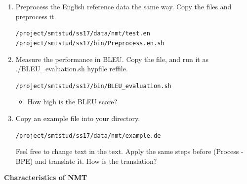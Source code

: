\documentclass[12pt,fleqn]{article}
\begin{document}
\begin{enumerate}
\item Preprocess the English reference data the same way. Copy the files and preprocess it. 

\texttt{/project/smtstud/ss17/data/nmt/test.en}  \\ 
\texttt{/project/smtstud/ss17/bin/Preprocess.en.sh} \\ 

\item Measure the performance in BLEU. Copy the file, and run it as ./BLEU\_evaluation.sh hypfile reffile. 

\texttt{/project/smtstud/ss17/bin/BLEU\_evaluation.sh} \\ 

\begin{itemize} 
 \item How high is the BLEU score? 
\end{itemize}

\item Copy an example file into your directory. 

\texttt{/project/smtstud/ss17/data/nmt/example.de} 

Feel free to change text in the text. Apply the same steps before (Process - BPE) and translate it. How is the translation? 

\end{enumerate} 

\textbf{Characteristics of NMT} \\ 
\end{document}
